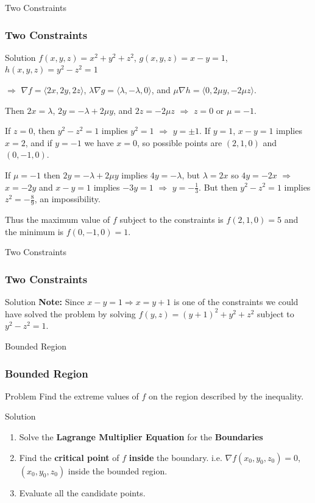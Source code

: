 \documentclass[aspectratio=169, UTF8]{beamer}
\begin{document}
\begin{frame}{Two Constraints}
    \frametitle{Two Constraints}
    \begin{block}{Solution}
        $f(x, y, z) = x^2 + y^2 + z^2$, $g(x, y, z) = x - y = 1$, $h(x, y, z) = y^2 - z^2 = 1$

        \vspace*{1em} $\Rightarrow$ $\nabla f = \langle 2x, 2y, 2z \rangle$, $\lambda \nabla g = \langle \lambda, -\lambda, 0 \rangle$, and $\mu \nabla h = \langle 0, 2\mu y, -2\mu z \rangle$.

        \vspace*{1em} Then $2x = \lambda$, $2y = -\lambda + 2\mu y$, and $2z = -2\mu z$ $\Rightarrow$ $z = 0$ or $\mu = -1$.

        \vspace*{1em}
        If $z = 0$, then $y^2 - z^2 = 1$ implies $y^2 = 1$ $\Rightarrow$ $y = \pm 1$. If $y = 1$, $x - y = 1$ implies $x = 2$, and if $y = -1$ we have $x = 0$, so possible points are $(2, 1, 0)$ and $(0, -1, 0)$.

        \vspace*{1em}
        If $\mu = -1$ then $2y = -\lambda + 2\mu y$ implies $4y = -\lambda$, but $\lambda = 2x$ so $4y = -2x$ $\Rightarrow$ $x = -2y$ and $x - y = 1$ implies $-3y = 1$ $\Rightarrow$ $y = -\frac{1}{3}$. But then $y^2 - z^2 = 1$ implies $z^2 = -\frac{8}{9}$, an impossibility.

        \vspace*{1em}
        Thus the maximum value of $f$ subject to the constraints is $f(2, 1, 0) = 5$ and the minimum is $f(0, -1, 0) = 1$.

    \end{block}
\end{frame}
\begin{frame}{Two Constraints}
    \frametitle{Two Constraints}
    \begin{block}{Solution}
        \textbf{Note:} Since $x - y = 1 \Rightarrow x = y + 1$ is one of the constraints we could have solved the problem by solving $f(y, z) = (y + 1)^2 + y^2 + z^2$ subject to $y^2 - z^2 = 1$.
    \end{block}
\end{frame}
\begin{frame}{Bounded Region}
    \frametitle{Bounded Region}
    \begin{block}{Problem}
        Find the extreme values of $f$ on the region described by the inequality.
    \end{block}
    \begin{block}{Solution}
        \begin{enumerate}
            \item Solve the \textbf{Lagrange Multiplier Equation} for the \textbf{Boundaries}
            \item Find the \textbf{critical point} of $f$ \textbf{inside} the boundary. i.e. $\nabla f(x_0, y_0, z_0) = 0$, $(x_0,y_0,z_0)$ inside the bounded region.
            \item Evaluate all the candidate points.
        \end{enumerate}
    \end{block}
\end{frame}
\end{document}
